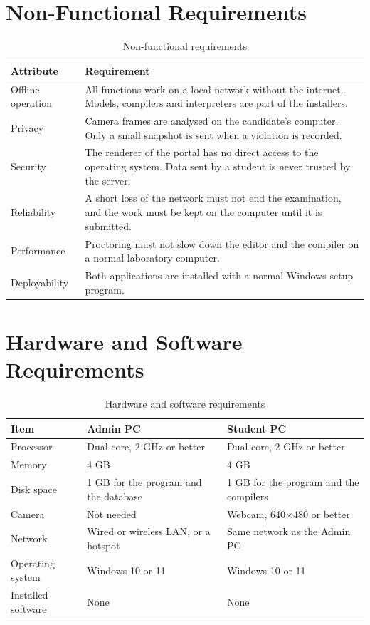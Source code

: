 \documentclass[12pt,a4paper]{report}
\begin{document}
\section{Non-Functional Requirements}
\begin{table}[H]
\centering
\caption{Non-functional requirements}\label{tab:nfr}
\footnotesize
\begin{tabularx}{\textwidth}{@{}L{2.6cm} Y@{}}
\toprule
\textbf{Attribute} & \textbf{Requirement}\\
\midrule
Offline operation & All functions work on a local network without the internet. Models, compilers and interpreters are part of the installers.\\
Privacy & Camera frames are analysed on the candidate's computer. Only a small snapshot is sent when a violation is recorded.\\
Security & The renderer of the portal has no direct access to the operating system. Data sent by a student is never trusted by the server.\\
Reliability & A short loss of the network must not end the examination, and the work must be kept on the computer until it is submitted.\\
Performance & Proctoring must not slow down the editor and the compiler on a normal laboratory computer.\\
Deployability & Both applications are installed with a normal Windows setup program.\\
\bottomrule
\end{tabularx}
\end{table}

\section{Hardware and Software Requirements}
\begin{table}[H]
\centering
\caption{Hardware and software requirements}\label{tab:hwsw}
\footnotesize
\begin{tabularx}{\textwidth}{@{}L{2.8cm} Y Y@{}}
\toprule
\textbf{Item} & \textbf{Admin PC} & \textbf{Student PC}\\
\midrule
Processor & Dual-core, 2 GHz or better & Dual-core, 2 GHz or better\\
Memory & 4 GB & 4 GB\\
Disk space & 1 GB for the program and the database & 1 GB for the program and the compilers\\
Camera & Not needed & Webcam, 640$\times$480 or better\\
Network & Wired or wireless LAN, or a hotspot & Same network as the Admin PC\\
Operating system & Windows 10 or 11 & Windows 10 or 11\\
Installed software & None & None\\
\bottomrule
\end{tabularx}
\end{table}
\end{document}
